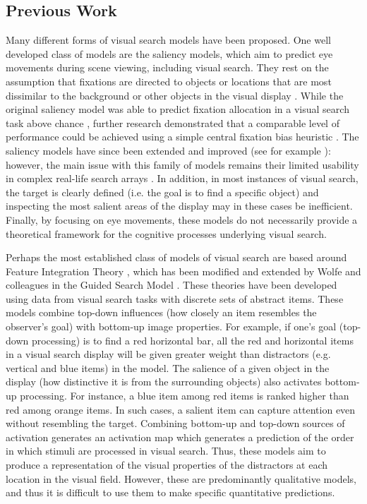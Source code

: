 \documentclass[preprint,12pt,authoryear]{elsarticle}
\begin{document}
\subsection{Previous Work}

Many different forms of visual search models have been proposed. One well developed class of models are the saliency models, which aim to predict eye movements during scene viewing, including visual search. They rest on the assumption that fixations are directed to objects or locations that are most dissimilar to the background or other objects in the visual display \citep{itti2000saliency, itti1998model, koch1987shifts}. While the original saliency model was able to predict fixation allocation in a visual search task above chance \citep{parkhurst2002modeling}, further research demonstrated that a comparable level of performance could be achieved using a simple central fixation bias heuristic \citep{tatler2007central}. The saliency models have since been extended and improved (see for example \cite{zhang2008sun}): however, the main issue with this family of models remains their limited usability in complex real-life search arrays \citep{tatler2011eye, koehler2014saliency}. In addition, in most instances of visual search, the target is clearly defined (i.e. the goal is to find a specific object) and inspecting the most salient areas of the display may in these cases be inefficient. Finally, by focusing on eye movements, these models do not necessarily provide a theoretical framework for the cognitive processes underlying visual search.

Perhaps the most established class of models of visual search are based around Feature Integration Theory \citep{treisman1980feature}, which has been modified and extended by Wolfe and colleagues in the Guided Search Model \citep{wolfe1989guided,wolfe2014approaches}. These theories have been developed using data from visual search tasks with discrete sets of abstract items. These models combine top-down influences (how closely an item resembles the observer's goal) with bottom-up image properties. For example, if one's goal (top-down processing) is to find a red horizontal bar, all the red and horizontal items in a visual search display will be given greater weight than distractors (e.g. vertical and blue items) in the model. The salience of a given object in the display (how distinctive it is from the surrounding objects) also activates bottom-up processing. For instance, a blue item among red items is ranked higher than red among orange items. In such cases, a salient item can capture attention even without resembling the target. Combining bottom-up and top-down sources of activation generates an activation map which generates a prediction of the order in which stimuli are processed in visual search. Thus, these models aim to produce a representation of the visual properties of the distractors at each location in the visual field. However, these are predominantly qualitative models, and thus it is difficult to use them to make specific quantitative predictions. 
\end{document}
